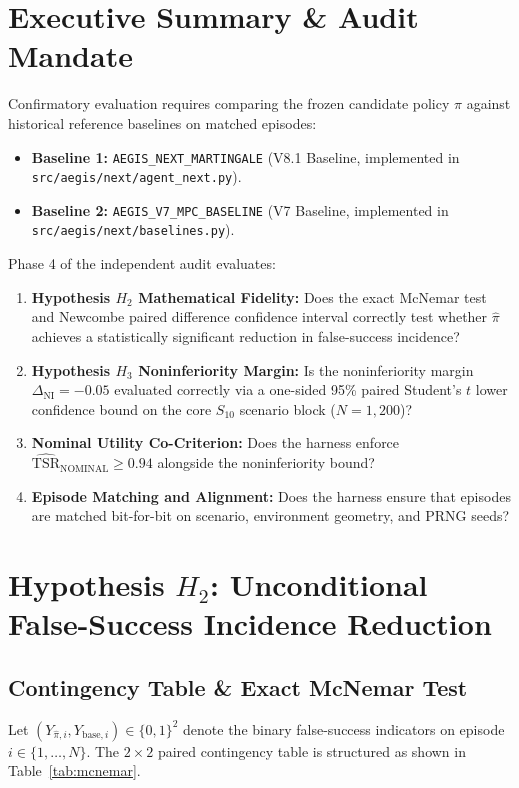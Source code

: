 \documentclass[10pt,a4paper]{article}
\begin{document}
\section{Executive Summary \& Audit Mandate}
Confirmatory evaluation requires comparing the frozen candidate policy $\hat{\pi}$ against historical reference baselines on matched episodes:
\begin{itemize}
    \item \textbf{Baseline 1:} \texttt{AEGIS\_NEXT\_MARTINGALE} (V8.1 Baseline, implemented in \texttt{src/aegis/next/agent\_next.py}).
    \item \textbf{Baseline 2:} \texttt{AEGIS\_V7\_MPC\_BASELINE} (V7 Baseline, implemented in \texttt{src/aegis/next/baselines.py}).
\end{itemize}
Phase 4 of the independent audit evaluates:
\begin{enumerate}
    \item \textbf{Hypothesis $H_2$ Mathematical Fidelity:} Does the exact McNemar test and Newcombe paired difference confidence interval correctly test whether $\hat{\pi}$ achieves a statistically significant reduction in false-success incidence?
    \item \textbf{Hypothesis $H_3$ Noninferiority Margin:} Is the noninferiority margin $\Delta_{\mathrm{NI}} = -0.05$ evaluated correctly via a one-sided 95\% paired Student's $t$ lower confidence bound on the core $S_{10}$ scenario block ($N = 1,200$)?
    \item \textbf{Nominal Utility Co-Criterion:} Does the harness enforce $\widehat{\mathrm{TSR}}_{\mathrm{NOMINAL}} \ge 0.94$ alongside the noninferiority bound?
    \item \textbf{Episode Matching and Alignment:} Does the harness ensure that episodes are matched bit-for-bit on scenario, environment geometry, and PRNG seeds?
\end{enumerate}

\section{Hypothesis $H_2$: Unconditional False-Success Incidence Reduction}

\subsection{Contingency Table \& Exact McNemar Test}
Let $(Y_{\hat{\pi}, i}, Y_{\mathrm{base}, i}) \in \{0, 1\}^2$ denote the binary false-success indicators on episode $i \in \{1, \dots, N\}$. The $2 \times 2$ paired contingency table is structured as shown in Table~\ref{tab:mcnemar}.
\end{document}
